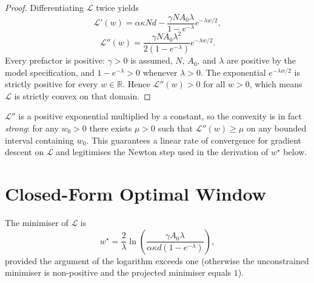 \begin{proof}
Differentiating $\mathcal{L}$ twice yields
\begin{equation}
    \mathcal{L}'(w) = \alpha \kappa N d
      - \frac{\gamma N A_0 \lambda}{1 - e^{-\lambda}}
        e^{-\lambda w / 2},
\end{equation}
\begin{equation}
    \mathcal{L}''(w)
      = \frac{\gamma N A_0 \lambda^2}{2(1 - e^{-\lambda})}
        e^{-\lambda w / 2}.
\end{equation}
Every prefactor is positive: $\gamma > 0$ is assumed,
$N$, $A_0$, and $\lambda$ are positive by the model
specification, and $1 - e^{-\lambda} > 0$ whenever $\lambda > 0$.
The exponential $e^{-\lambda w / 2}$ is strictly positive for
every $w \in \mathbb{R}$. Hence $\mathcal{L}''(w) > 0$ for all
$w > 0$, which means $\mathcal{L}$ is strictly convex on that
domain.
\end{proof}

\begin{remark}
$\mathcal{L}''$ is a positive exponential multiplied by a
constant, so the convexity is in fact \emph{strong}: for any
$w_0 > 0$ there exists $\mu > 0$ such that
$\mathcal{L}''(w) \ge \mu$ on any bounded interval containing
$w_0$. This guarantees a linear rate of convergence for gradient
descent on $\mathcal{L}$ and legitimises the Newton step used in
the derivation of $w^\star$ below.
\end{remark}

\section{Closed-Form Optimal Window}\label{app:proof_optw}

\begin{theorem}\label{thm:optw2}
The minimiser of $\mathcal{L}$ is
\begin{equation}\label{eq:opt_w_app}
    w^\star = \frac{2}{\lambda}
      \ln\!\left(
      \frac{\gamma A_0 \lambda}{\alpha \kappa d (1 - e^{-\lambda})}
      \right),
\end{equation}
provided the argument of the logarithm exceeds one (otherwise the
unconstrained minimiser is non-positive and the projected minimiser
equals $1$).
\end{theorem}

